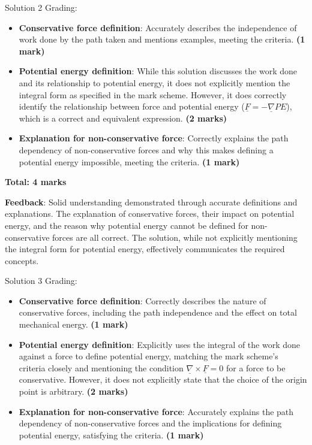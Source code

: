 \documentclass[a4paper,11pt]{article}
\begin{document}
Solution 2 Grading:

\begin{itemize}
    \item \textbf{Conservative force definition}: Accurately describes the independence of work done by the path taken and mentions examples, meeting the criteria. \textbf{(1 mark)}
    \item \textbf{Potential energy definition}: While this solution discusses the work done and its relationship to potential energy, it does not explicitly mention the integral form as specified in the mark scheme. However, it does correctly identify the relationship between force and potential energy (\( \underline{F} = -\underline{\nabla} PE \)), which is a correct and equivalent expression. \textbf{(2 marks)}
    \item \textbf{Explanation for non-conservative force}: Correctly explains the path dependency of non-conservative forces and why this makes defining a potential energy impossible, meeting the criteria. \textbf{(1 mark)}
\end{itemize}

\textbf{Total: 4 marks}

\textbf{Feedback}: Solid understanding demonstrated through accurate definitions and explanations. The explanation of conservative forces, their impact on potential energy, and the reason why potential energy cannot be defined for non-conservative forces are all correct. The solution, while not explicitly mentioning the integral form for potential energy, effectively communicates the required concepts.

Solution 3 Grading:

\begin{itemize}
    \item \textbf{Conservative force definition}: Correctly describes the nature of conservative forces, including the path independence and the effect on total mechanical energy. \textbf{(1 mark)}
    \item \textbf{Potential energy definition}: Explicitly uses the integral of the work done against a force to define potential energy, matching the mark scheme's criteria closely and mentioning the condition \( \underline{\nabla} \times \underline{F} = 0 \) for a force to be conservative. However, it does not explicitly state that the choice of the origin point is arbitrary. \textbf{(2 marks)}
    \item \textbf{Explanation for non-conservative force}: Accurately explains the path dependency of non-conservative forces and the implications for defining potential energy, satisfying the criteria. \textbf{(1 mark)}
\end{itemize}
\end{document}

